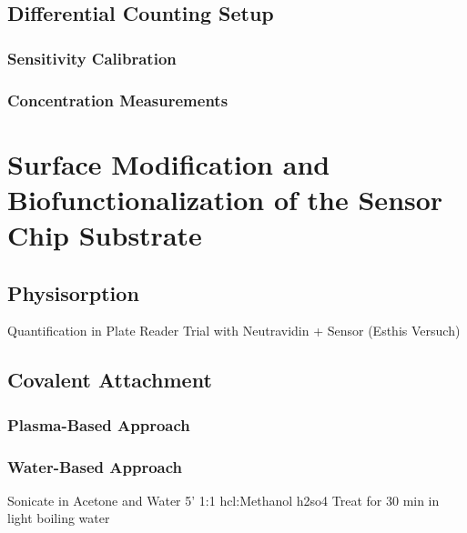 \subsection{Differential Counting Setup}

\subsubsection{Sensitivity Calibration}

\subsubsection{Concentration Measurements}
\cleardoubleemptypage

\section{Surface Modification and Biofunctionalization of the Sensor Chip Substrate}

\subsection{Physisorption}
Quantification in Plate Reader
Trial with Neutravidin + Sensor (Esthis Versuch)
\clearpage

\subsection{Covalent Attachment}
\clearpage

\subsubsection{Plasma-Based Approach}

\subsubsection{Water-Based Approach}
Sonicate in Acetone and Water 5'
1:1 \gls{hcl}:Methanol
\gls{h2so4}
Treat for 30 min in light boiling water